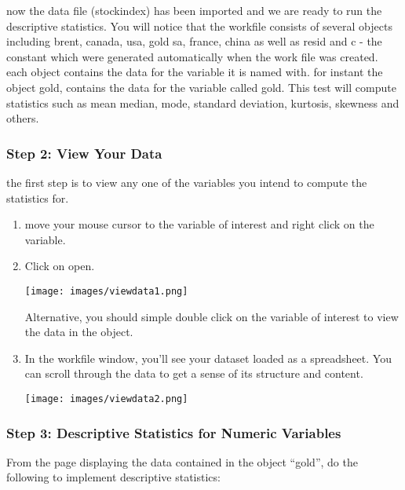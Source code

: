 \documentclass[
  letterpaper,
  DIV=11,
  numbers=noendperiod]{scrartcl}
\begin{document}
now the data file (stockindex) has been imported and we are ready to run
the descriptive statistics. You will notice that the workfile consists
of several objects including brent, canada, usa, gold sa, france, china
as well as resid and c - the constant which were generated automatically
when the work file was created. each object contains the data for the
variable it is named with. for instant the object gold, contains the
data for the variable called gold. This test will compute statistics
such as mean median, mode, standard deviation, kurtosis, skewness and
others.

\hypertarget{step-2-view-your-data}{%
\subsubsection{\texorpdfstring{\textbf{Step 2: View Your
Data}}{Step 2: View Your Data}}\label{step-2-view-your-data}}

the first step is to view any one of the variables you intend to compute
the statistics for.

\begin{enumerate}
\def\labelenumi{\arabic{enumi}.}
\item
  move your mouse cursor to the variable of interest and right click on
  the variable.
\item
  Click on open.

  \texttt{[image: images/viewdata1.png]}

  Alternative, you should simple double click on the variable of
  interest to view the data in the object.
\item
  In the workfile window, you'll see your dataset loaded as a
  spreadsheet. You can scroll through the data to get a sense of its
  structure and content.

  \texttt{[image: images/viewdata2.png]}
\end{enumerate}

\hypertarget{step-3-descriptive-statistics-for-numeric-variables}{%
\subsubsection{\texorpdfstring{\textbf{Step 3: Descriptive Statistics
for Numeric
Variables}}{Step 3: Descriptive Statistics for Numeric Variables}}\label{step-3-descriptive-statistics-for-numeric-variables}}

From the page displaying the data contained in the object ``gold'', do
the following to implement descriptive statistics:
\end{document}
